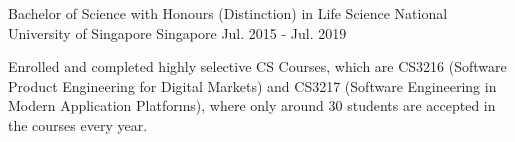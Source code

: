 

\begin{cventries}

  \cventry
    {Bachelor of Science with Honours (Distinction) in Life Science} %
    {National University of Singapore} %
    {Singapore} %
    {Jul. 2015 - Jul. 2019} %
    {
      \begin{cvitems} %
        \item {Enrolled and completed highly selective CS Courses, which are CS3216 (Software Product Engineering for Digital Markets) and CS3217 (Software Engineering in Modern Application Platforms), where only around 30 students are accepted in the courses every year.}
      \end{cvitems}
    }
\end{cventries}
